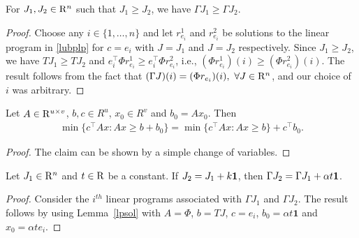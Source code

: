 \begin{lemma}\label{gmonotone}
For $J_1, J_2\in \mathrm{R}^n$ such that $J_1\geq J_2$, we have $\Gamma J_1\geq \Gamma J_2$.
\end{lemma}
\begin{proof}
Choose any $i\in \{1,\ldots,n\}$ and let $r^1_{e_i}$ and $r^2_{e_i}$ be solutions to the linear program in \eqref{lubplp} for $c=e_i$ with $J=J_1$ and $J=J_2$ respectively. Since $J_1\geq J_2$, we have $TJ_1\geq TJ_2$ and $e_i^\top \Phi r^1_{e_i} \geq e_i^\top \Phi r^2_{e_i}$, i.e., $(\Phi r^1_{e_i})(i)\geq (\Phi r^2_{e_i})(i)$. The result follows from the fact that $(\Gamma J)(i)=(\Phi r_{e_i})(i),\mbox{ }\forall J\in \mathrm{R}^n$, and our choice of $i$ was arbitrary.
\end{proof}
\begin{lemma}\label{lpsol}
Let $A\in \mathrm{R}^{u\times v}$, $b,c\in R^u$, $x_0 \in R^v$ and $b_0=Ax_0$. Then
\begin{align}
\min\{c^\top Ax:Ax\geq b+b_0\} =\min\{c^\top Ax:Ax\geq b\}+c^\top b_0.
\end{align}
\end{lemma}
\begin{proof}
The claim can be shown by a simple change of variables.
\end{proof}
\begin{lemma}\label{gshift}
Let $J_1\in \mathrm{R}^n$ and $t\in \mathrm{R}$ be a constant. If $J_2=J_1+k\mathbf{1}$, then $\Gamma J_2=\Gamma J_1+\alpha t\mathbf{1}$.
\end{lemma}
\begin{proof}
Consider the $i^{th}$ linear programs associated with $\Gamma J_1$ and $\Gamma J_2$. The result follows by using Lemma~\ref{lpsol} with $A=\Phi$, $b=TJ$, $c=e_i$, $b_0=\alpha t\mathbf{1}$ and $x_0=\alpha t e_i$.
\end{proof}
\begin{comment}
\begin{proof}
Choose any $i\in \{1,\ldots,n\}$, let $r^1_{e_i}$ and $r^2_{e_i}$ be solutions to the linear program in \eqref{lubplp} for $c=e_i$ with $J=J_1$ and $J=J_2$ respectively. By Assumption~\ref{one} and Lemma~\ref{shift}, we know that $r^1_{e_i}+\alpha k e_1$ is feasible for the $i^{th}$ linear program associated with $\Gamma J_2$ and we claim that $(\Phi r^2_{e_i})(i)=(\Phi r^1_{e_i})(i)+\alpha k$. On the contrary, if $(\Phi r^2_{e_i})(i)\ne (\Phi r^1_{e_i})(i)+\alpha k$, then $(\Phi r^2_{e_i})(i)< (\Phi r^1_{e_i})(i)+\alpha k$ and since $r^2_{e_i}-\alpha k e_1$ is feasible for the $i^{th}$ linear program associated with $\Gamma J_1$ we will have $(\Phi r^2_{e_i})(i)-k\alpha<(\Phi r^1_{e_i})(i)$. Thus we have arrived at a contradiction because we assumed that $r^1_{e_i}$ is a solution for the $i^{th}$ linear program associated with $\Gamma J_1$. So 
\begin{align}\label{equality}
&(\Phi r^2_{e_i})(i)=(\Phi r^1_{e_i})(i)+\alpha k, \mb\forall i \in \{1,\ldots,n\},\\ \mb &\text{since $i$ was arbitrary}.\nn
\end{align}
From \eqref{equality} and Assumption~\ref{one} it follows that $\Gamma J_2=\Gamma J_1+\alpha k \one$.
\end{proof}
\end{comment}
